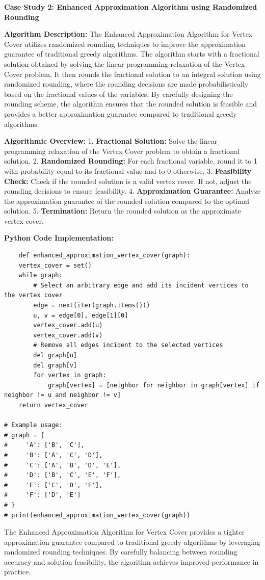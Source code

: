 \documentclass[12pt]{book} %
\begin{document}
\textbf{Case Study 2: Enhanced Approximation Algorithm using Randomized Rounding}

\textbf{Algorithm Description:} The Enhanced Approximation Algorithm for Vertex Cover utilizes randomized rounding techniques to improve the approximation guarantee of traditional greedy algorithms. The algorithm starts with a fractional solution obtained by solving the linear programming relaxation of the Vertex Cover problem. It then rounds the fractional solution to an integral solution using randomized rounding, where the rounding decisions are made probabilistically based on the fractional values of the variables. By carefully designing the rounding scheme, the algorithm ensures that the rounded solution is feasible and provides a better approximation guarantee compared to traditional greedy algorithms.

\textbf{Algorithmic Overview:} 
1. \textbf{Fractional Solution:} Solve the linear programming relaxation of the Vertex Cover problem to obtain a fractional solution.
2. \textbf{Randomized Rounding:} For each fractional variable, round it to 1 with probability equal to its fractional value and to 0 otherwise.
3. \textbf{Feasibility Check:} Check if the rounded solution is a valid vertex cover. If not, adjust the rounding decisions to ensure feasibility.
4. \textbf{Approximation Guarantee:} Analyze the approximation guarantee of the rounded solution compared to the optimal solution.
5. \textbf{Termination:} Return the rounded solution as the approximate vertex cover.

\textbf{Python Code Implementation:}
\FloatBarrier
\begin{lstlisting}
    def enhanced_approximation_vertex_cover(graph):
    vertex_cover = set()
    while graph:
        # Select an arbitrary edge and add its incident vertices to the vertex cover
        edge = next(iter(graph.items()))
        u, v = edge[0], edge[1][0]
        vertex_cover.add(u)
        vertex_cover.add(v)
        # Remove all edges incident to the selected vertices
        del graph[u]
        del graph[v]
        for vertex in graph:
            graph[vertex] = [neighbor for neighbor in graph[vertex] if neighbor != u and neighbor != v]
    return vertex_cover

# Example usage:
# graph = {
#     'A': ['B', 'C'],
#     'B': ['A', 'C', 'D'],
#     'C': ['A', 'B', 'D', 'E'],
#     'D': ['B', 'C', 'E', 'F'],
#     'E': ['C', 'D', 'F'],
#     'F': ['D', 'E']
# }
# print(enhanced_approximation_vertex_cover(graph))
\end{lstlisting}
\FloatBarrier
The Enhanced Approximation Algorithm for Vertex Cover provides a tighter approximation guarantee compared to traditional greedy algorithms by leveraging randomized rounding techniques. By carefully balancing between rounding accuracy and solution feasibility, the algorithm achieves improved performance in practice.
\end{document}
